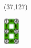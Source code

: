 \documentclass{extarticle}
\begin{document}
\begin{textblock}{0}(37,127)
\vfill
{\centerline{\includegraphics[height=14mm]{tools/images/segment-numbering.pdf}}} 
\vfill
\end{textblock}
\end{document}
